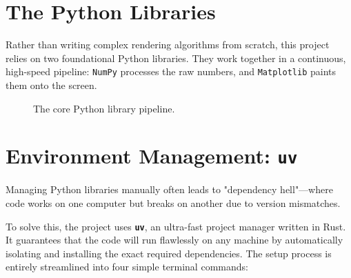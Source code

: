 \documentclass[12pt, a4paper]{report}
\begin{document}
\section{The Python Libraries}

Rather than writing complex rendering algorithms from scratch, this project relies on two foundational Python libraries. They work together in a continuous, high-speed pipeline: \texttt{NumPy} processes the raw numbers, and \texttt{Matplotlib} paints them onto the screen.

\vspace{0.6cm}
\begin{figure}[htbp]
    \centering
    \caption{The core Python library pipeline.}
    \label{fig:python_libraries}
\end{figure}
\vspace{0.4cm}

\section{Environment Management: \texttt{uv}}

Managing Python libraries manually often leads to "dependency hell"—where code works on one computer but breaks on another due to version mismatches. 

To solve this, the project uses \textbf{\texttt{uv}}, an ultra-fast project manager written in Rust.\cite{uv_docs} It guarantees that the code will run flawlessly on any machine by automatically isolating and installing the exact required dependencies. The setup process is entirely streamlined into four simple terminal commands:
\end{document}
